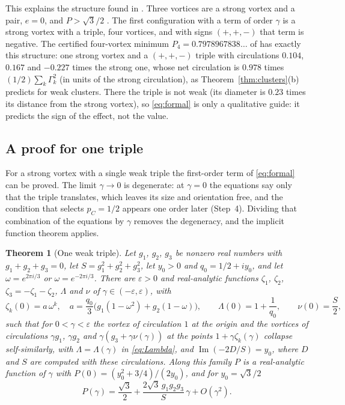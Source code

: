 \documentclass[11pt]{article}
\newtheorem{theorem}{Theorem}
\theoremstyle{definition}
\newcommand{\im}{\operatorname{Im}}
\begin{document}
This explains the structure found in \cite{mw2026}. Three vortices are a strong vortex and a pair, $e = 0$, and $P > \sqrt{3}/2$ \cite[Corollary~1]{mw2026}. The first configuration with a term of order $\gamma$ is a strong vortex with a triple, four vortices, and with signs $(+,+,-)$ that term is negative. The certified four-vortex minimum $P_4 = 0.7978967838\ldots$ of \cite[Theorem~4]{mw2026} has exactly this structure: one strong vortex and a $(+,+,-)$ triple with circulations $0.104$, $0.167$ and $-0.227$ times the strong one, whose net circulation is $0.978$ times $(1/2)\sum_k\Gamma_k^2$ (in units of the strong circulation), as Theorem~\ref{thm:clusters}(b) predicts for weak clusters. There the triple is not weak (its diameter is $0.23$ times its distance from the strong vortex), so \eqref{eq:formal} is only a qualitative guide: it predicts the sign of the effect, not the value.

\subsection{A proof for one triple}\label{sec:triple}

For a strong vortex with a single weak triple the first-order term of \eqref{eq:formal} can be proved. The limit $\gamma \to 0$ is degenerate: at $\gamma = 0$ the equations say only that the triple translates, which leaves its size and orientation free, and the condition that selects $p_C = 1/2$ appears one order later (Step~4). Dividing that combination of the equations by $\gamma$ removes the degeneracy, and the implicit function theorem applies.

\begin{theorem}[One weak triple]\label{thm:triple}
Let $g_1$, $g_2$, $g_3$ be nonzero real numbers with $g_1 + g_2 + g_3 = 0$, let $S = g_1^2 + g_2^2 + g_3^2$, let $y_0 > 0$ and $q_0 = 1/2 + iy_0$, and let $\omega = e^{2\pi i/3}$ or $\omega = e^{-2\pi i/3}$. There are $\varepsilon > 0$ and real-analytic functions $\zeta_1$, $\zeta_2$, $\zeta_3 = -\zeta_1 - \zeta_2$, $\Lambda$ and $\nu$ of $\gamma \in (-\varepsilon, \varepsilon)$, with
\[
  \zeta_k(0) = a\,\omega^k, \quad a = \frac{q_0}{3}\bigl(g_1(1 - \omega^2) + g_2(1 - \omega)\bigr), \qquad \Lambda(0) = 1 + \frac{1}{q_0}, \qquad \nu(0) = \frac{S}{2},
\]
such that for $0 < \gamma < \varepsilon$ the vortex of circulation $1$ at the origin and the vortices of circulations $\gamma g_1$, $\gamma g_2$ and $\gamma(g_3 + \gamma\nu(\gamma))$ at the points $1 + \gamma\zeta_k(\gamma)$ collapse self-similarly, with $\Lambda = \Lambda(\gamma)$ in \eqref{eq:Lambda}, and $\im(-2D/S) = y_0$, where $D$ and $S$ are computed with these circulations. Along this family $P$ is a real-analytic function of $\gamma$ with $P(0) = (y_0^2 + 3/4)/(2y_0)$, and for $y_0 = \sqrt{3}/2$
\begin{equation}\label{eq:triple}
  P(\gamma) = \frac{\sqrt{3}}{2} + \frac{2\sqrt{3}\,g_1g_2g_3}{S}\,\gamma + O(\gamma^2).
\end{equation}
\end{theorem}
\end{document}
